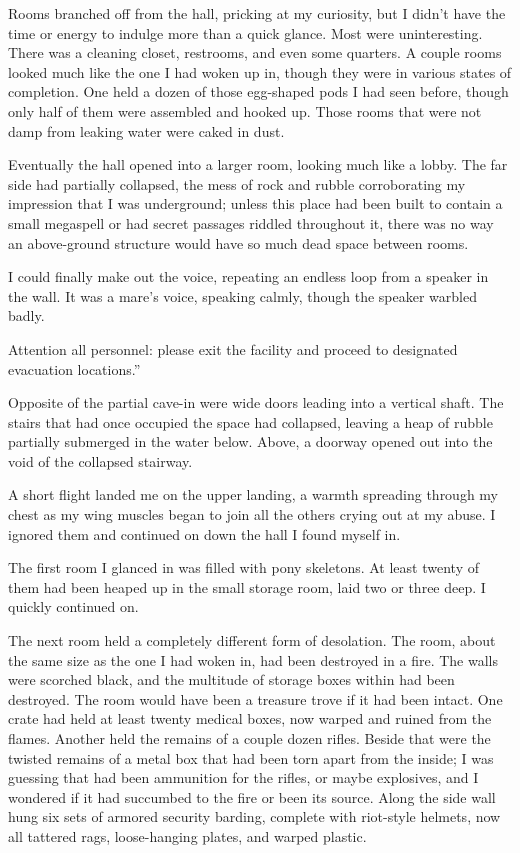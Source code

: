 Rooms branched off from the hall, pricking at my curiosity, but I didn’t have the time or energy to indulge more than a quick glance. Most were uninteresting. There was a cleaning closet, restrooms, and even some quarters. A couple rooms looked much like the one I had woken up in, though they were in various states of completion. One held a dozen of those egg-shaped pods I had seen before, though only half of them were assembled and hooked up. Those rooms that were not damp from leaking water were caked in dust.

Eventually the hall opened into a larger room, looking much like a lobby. The far side had partially collapsed, the mess of rock and rubble corroborating my impression that I was underground; unless this place had been built to contain a small megaspell or had secret passages riddled throughout it, there was no way an above-ground structure would have so much dead space between rooms.

I could finally make out the voice, repeating an endless loop from a speaker in the wall. It was a mare’s voice, speaking calmly, though the speaker warbled badly.

\leavevmode{}Attention all personnel: please exit the facility and proceed to designated evacuation locations.”

Opposite of the partial cave-in were wide doors leading into a vertical shaft. The stairs that had once occupied the space had collapsed, leaving a heap of rubble partially submerged in the water below. Above, a doorway opened out into the void of the collapsed stairway.

A short flight landed me on the upper landing, a warmth spreading through my chest as my wing muscles began to join all the others crying out at my abuse. I ignored them and continued on down the hall I found myself in.

The first room I glanced in was filled with pony skeletons. At least twenty of them had been heaped up in the small storage room, laid two or three deep. I quickly continued on.

The next room held a completely different form of desolation. The room, about the same size as the one I had woken in, had been destroyed in a fire. The walls were scorched black, and the multitude of storage boxes within had been destroyed. The room would have been a treasure trove if it had been intact. One crate had held at least twenty medical boxes, now warped and ruined from the flames. Another held the remains of a couple dozen rifles. Beside that were the twisted remains of a metal box that had been torn apart from the inside; I was guessing that had been ammunition for the rifles, or maybe explosives, and I wondered if it had succumbed to the fire or been its source. Along the side wall hung six sets of armored security barding, complete with riot-style helmets, now all tattered rags, loose-hanging plates, and warped plastic.

